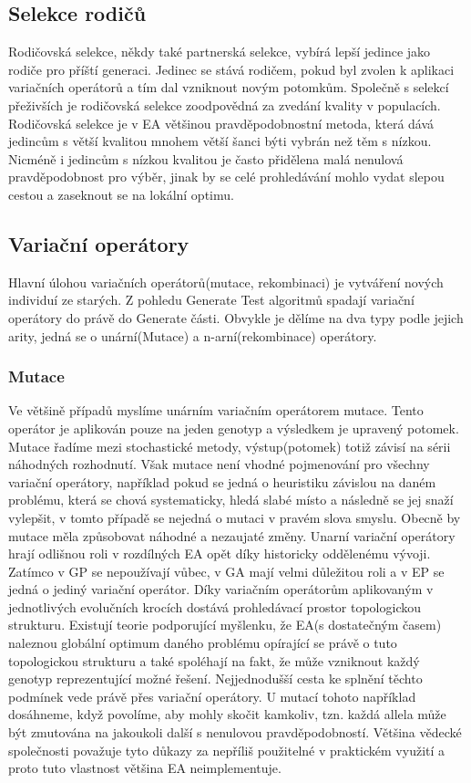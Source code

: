 \subsection{Selekce rodičů}
Rodičovská selekce, někdy také partnerská selekce, vybírá lepší jedince jako rodiče pro příští generaci. Jedinec se stává rodičem, pokud byl zvolen k aplikaci variačních operátorů a tím dal vzniknout novým potomkům. Společně s selekcí přeživších je rodičovská selekce zoodpovědná za zvedání kvality v populacích. Rodičovská selekce je v EA většinou pravděpodobnostní metoda, která dává jedincům s větší kvalitou mnohem větší šanci býti vybrán než těm s nízkou. Nicméně i jedincům s nízkou kvalitou je často přidělena malá nenulová pravděpodobnost pro výběr, jinak by se celé prohledávání mohlo vydat slepou cestou a zaseknout se na lokální optimu. 
\subsection{Variační operátory}
Hlavní úlohou variačních operátorů(mutace, rekombinaci) je vytváření nových individuí ze starých. Z pohledu Generate  Test algoritmů spadají variační operátory do právě do Generate části. Obvykle je dělíme na dva typy podle jejich arity, jedná se o unární(Mutace) a n-arní(rekombinace) operátory.
\subsubsection{Mutace}
Ve většině případů myslíme unárním variačním operátorem mutace. Tento operátor je aplikován pouze na jeden genotyp a výsledkem je upravený potomek. Mutace řadíme mezi stochastické metody, výstup(potomek) totiž závisí na sérii náhodných rozhodnutí. Však mutace není vhodné pojmenování pro všechny variační operátory, například pokud se jedná o heuristiku závislou na daném problému, která se chová systematicky, hledá slabé místo a následně se jej snaží vylepšit, v tomto případě se nejedná o mutaci v pravém slova smyslu. Obecně by mutace měla způsobovat náhodné a nezaujaté změny. Unarní variační operátory hrají odlišnou roli v rozdílných EA opět díky historicky oddělenému vývoji. Zatímco v GP se nepoužívají vůbec, v GA mají velmi důležitou roli a v EP se jedná o jediný variační operátor. Díky variačním operátorům aplikovaným v jednotlivých evolučních krocích dostává prohledávací prostor topologickou strukturu. Existují teorie podporující myšlenku, že EA(s dostatečným časem) naleznou globální optimum daného problému opírající se právě o tuto topologickou strukturu a také spoléhají na fakt, že může vzniknout každý genotyp reprezentující možné řešení. Nejjednodušší cesta ke splnění těchto podmínek vede právě přes variační operátory. U mutací tohoto například dosáhneme, když povolíme, aby mohly skočit kamkoliv, tzn. každá allela může být zmutována na jakoukoli další s nenulovou pravděpodobností. Většina vědecké společnosti považuje tyto důkazy za nepříliš použitelné v praktickém využití a proto tuto vlastnost většina EA neimplementuje.  
